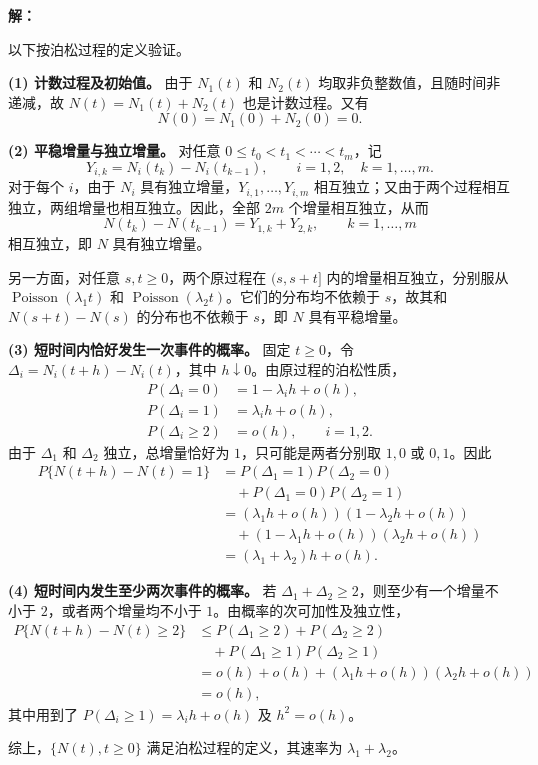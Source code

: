 \documentclass[12pt,a4paper]{article}
\begin{document}
\begin{answerbox}
\textbf{解：}

以下按泊松过程的定义验证。

\textbf{(1) 计数过程及初始值。}
由于 $N_1(t)$ 和 $N_2(t)$ 均取非负整数值，且随时间非递减，故 $N(t)=N_1(t)+N_2(t)$ 也是计数过程。又有
$$
N(0)=N_1(0)+N_2(0)=0.
$$

\textbf{(2) 平稳增量与独立增量。}
对任意 $0\leq t_0<t_1<\cdots<t_m$，记
$$
Y_{i,k}=N_i(t_k)-N_i(t_{k-1}),
\qquad i=1,2,\quad k=1,\ldots,m.
$$
对于每个 $i$，由于 $N_i$ 具有独立增量，$Y_{i,1},\ldots,Y_{i,m}$ 相互独立；又由于两个过程相互独立，两组增量也相互独立。因此，全部 $2m$ 个增量相互独立，从而
$$
N(t_k)-N(t_{k-1})=Y_{1,k}+Y_{2,k},
\qquad k=1,\ldots,m
$$
相互独立，即 $N$ 具有独立增量。

另一方面，对任意 $s,t\geq0$，两个原过程在 $(s,s+t]$ 内的增量相互独立，分别服从 $\operatorname{Poisson}(\lambda_1t)$ 和 $\operatorname{Poisson}(\lambda_2t)$。它们的分布均不依赖于 $s$，故其和 $N(s+t)-N(s)$ 的分布也不依赖于 $s$，即 $N$ 具有平稳增量。

\textbf{(3) 短时间内恰好发生一次事件的概率。}
固定 $t\geq0$，令 $\Delta_i=N_i(t+h)-N_i(t)$，其中 $h\downarrow0$。由原过程的泊松性质，
$$
\begin{aligned}
P(\Delta_i=0)&=1-\lambda_i h+o(h),\\
P(\Delta_i=1)&=\lambda_i h+o(h),\\
P(\Delta_i\geq2)&=o(h),\qquad i=1,2.
\end{aligned}
$$
由于 $\Delta_1$ 和 $\Delta_2$ 独立，总增量恰好为 $1$，只可能是两者分别取 $1,0$ 或 $0,1$。因此
$$
\begin{aligned}
P\{N(t+h)-N(t)=1\}
&=P(\Delta_1=1)P(\Delta_2=0)\\
&\quad+P(\Delta_1=0)P(\Delta_2=1)\\
&=(\lambda_1h+o(h))(1-\lambda_2h+o(h))\\
&\quad+(1-\lambda_1h+o(h))(\lambda_2h+o(h))\\
&=(\lambda_1+\lambda_2)h+o(h).
\end{aligned}
$$

\textbf{(4) 短时间内发生至少两次事件的概率。}
若 $\Delta_1+\Delta_2\geq2$，则至少有一个增量不小于 $2$，或者两个增量均不小于 $1$。由概率的次可加性及独立性，
$$
\begin{aligned}
P\{N(t+h)-N(t)\geq2\}
&\leq P(\Delta_1\geq2)+P(\Delta_2\geq2)\\
&\quad+P(\Delta_1\geq1)P(\Delta_2\geq1)\\
&=o(h)+o(h)+(\lambda_1h+o(h))(\lambda_2h+o(h))\\
&=o(h),
\end{aligned}
$$
其中用到了 $P(\Delta_i\geq1)=\lambda_i h+o(h)$ 及 $h^2=o(h)$。

综上，$\{N(t),t\geq0\}$ 满足泊松过程的定义，其速率为 $\lambda_1+\lambda_2$。
\end{answerbox}
\end{document}

